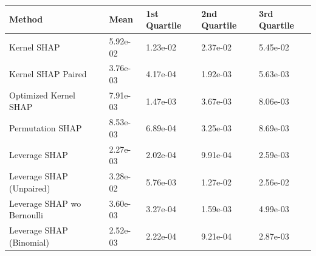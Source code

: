 \begin{tabular}{lllll}
  \toprule
  \textbf{Method} & \textbf{Mean} & \textbf{1st Quartile} & \textbf{2nd Quartile} & \textbf{3rd Quartile} \\ \midrule
Kernel SHAP & 5.92e-02 & 1.23e-02 & 2.37e-02 & 5.45e-02\\
Kernel SHAP Paired & 3.76e-03 & 4.17e-04 & 1.92e-03 & 5.63e-03\\
Optimized Kernel SHAP & 7.91e-03 & 1.47e-03 & 3.67e-03 & 8.06e-03\\
Permutation SHAP & 8.53e-03 & 6.89e-04 & 3.25e-03 & 8.69e-03\\
Leverage SHAP & \cellcolor{gold!60}2.27e-03 & \cellcolor{gold!60}2.02e-04 & \cellcolor{silver!60}9.91e-04 & \cellcolor{gold!60}2.59e-03\\
Leverage SHAP (Unpaired) & 3.28e-02 & 5.76e-03 & 1.27e-02 & 2.56e-02\\
Leverage SHAP wo Bernoulli & \cellcolor{bronze!60}3.60e-03 & \cellcolor{bronze!60}3.27e-04 & \cellcolor{bronze!60}1.59e-03 & \cellcolor{bronze!60}4.99e-03\\
Leverage SHAP (Binomial) & \cellcolor{silver!60}2.52e-03 & \cellcolor{silver!60}2.22e-04 & \cellcolor{gold!60}9.21e-04 & \cellcolor{silver!60}2.87e-03\\
\bottomrule
\end{tabular}
